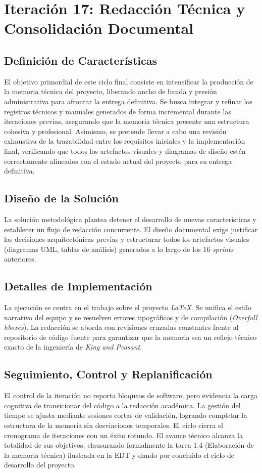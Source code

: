 \chapter[Iteración 17: Redacción y Consolidación Documental]{Iteración 17: Redacción Técnica y Consolidación Documental}

\section{Definición de Características}
El objetivo primordial de este ciclo final consiste en intensificar la producción de la memoria técnica del proyecto, liberando ancho de banda y presión administrativa para afrontar la entrega definitiva. Se busca integrar y refinar los registros técnicos y manuales generados de forma incremental durante las iteraciones previas, asegurando que la memoria técnica presente una estructura cohesiva y profesional. Asimismo, se pretende llevar a cabo una revisión exhaustiva de la trazabilidad entre los requisitos iniciales y la implementación final, verificando que todos los artefactos visuales y diagramas de diseño estén correctamente alineados con el estado actual del proyecto para su entrega definitiva.

\section{Diseño de la Solución}
La solución metodológica plantea detener el desarrollo de nuevas características y establecer un flujo de redacción concurrente. El diseño documental exige justificar las decisiones arquitectónicas previas y estructurar todos los artefactos visuales (diagramas UML, tablas de análisis) generados a lo largo de los 16 \textit{sprints} anteriores.

\section{Detalles de Implementación}
La ejecución se centra en el trabajo sobre el proyecto \textit{LaTeX}. Se unifica el estilo narrativo del equipo y se resuelven errores tipográficos y de compilación (\textit{Overfull hboxes}). La redacción se aborda con revisiones cruzadas constantes frente al repositorio de código fuente para garantizar que la memoria sea un reflejo técnico exacto de la ingeniería de \textit{King and Peasant}.

\section{Seguimiento, Control y Replanificación}
El control de la iteración no reporta bloqueos de software, pero evidencia la carga cognitiva de transicionar del código a la redacción académica. La gestión del tiempo se ajusta mediante sesiones cortas de validación, logrando completar la estructura de la memoria sin desviaciones temporales. El ciclo cierra el cronograma de iteraciones con un éxito rotundo. El avance técnico alcanza la totalidad de sus objetivos, clausurando formalmente la tarea 1.4 (Elaboración de la memoria técnica) ilustrada en la EDT y dando por concluido el ciclo de desarrollo del proyecto.